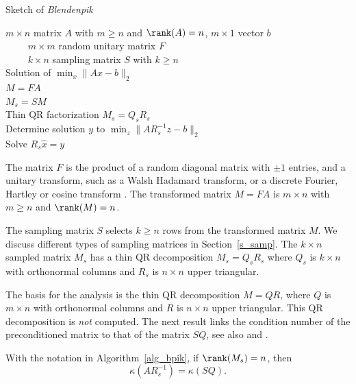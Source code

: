 \documentclass{siamltex}
\begin{document}
\begin{algorithm}
\caption{Sketch of \textsl{Blendenpik} \cite{AMTol10}}\label{alg_bpik}
\begin{algorithmic}
\REQUIRE $m\times n$ matrix $A$ with $m\geq n$ and $\rank(A)=n$,
$m\times 1$ vector $b$\\
$\qquad$ $m\times m$ random unitary matrix $F$\\
$\qquad$ $k\times n$ sampling matrix $S$ with $k\geq n$\\
\ENSURE Solution of $\min_x{\|Ax-b\|_2}$\\
$\qquad$\\
\STATE $M=FA$ $\qquad$ \\
\STATE $M_s=SM$  $\qquad$ \\

\STATE Thin QR factorization $M_s=Q_sR_s$
$\qquad$ \\
\STATE Determine solution $y$ to $\min_z{\|AR_s^{-1}z-b\|_2}$
$\qquad$ \\
\STATE Solve $R_s\hat{x}=y$ $\qquad$ 
\end{algorithmic}
\end{algorithm}

The matrix $F$
is the product of a random diagonal matrix with $\pm 1$ entries, and
a unitary transform, such as a Walsh Hadamard transform, or a discrete Fourier,
Hartley or cosine transform \cite[Section 3.2]{AMTol10}. 
The transformed matrix $M=FA$ is $m\times n$ with $m\geq n$ and $\rank(M)=n$. 

The sampling matrix $S$ selects $k\geq n$ rows
from the transformed matrix $M$.  We discuss different types of
sampling matrices in Section~\ref{s_samp}.  The $k\times n$ sampled
matrix $M_s$ has a thin QR decomposition $M_s=Q_sR_s$ where $Q_s$ is
$k\times n$ with orthonormal columns and $R_s$ is $n\times n$ upper
triangular.

The basis for the analysis is the thin QR decomposition
$M=QR$, where $Q$ is $m\times n$ with 
orthonormal columns and $R$ is $n\times n$ upper triangular. 
This QR decomposition is \textit{not} computed.
The next result links the condition number of the 
preconditioned matrix to that of the matrix $SQ$,
see also \cite[Section~3.1]{AMTol10} and
\cite[Theorem 1]{RokT08}. 

\begin{lemma}\label{l_1}
With the notation in Algorithm~\ref{alg_bpik},
if $\rank(M_s)=n$, then 
$$\kappa(AR_s^{-1})=\kappa(SQ).$$
\end{lemma}
\end{document}
